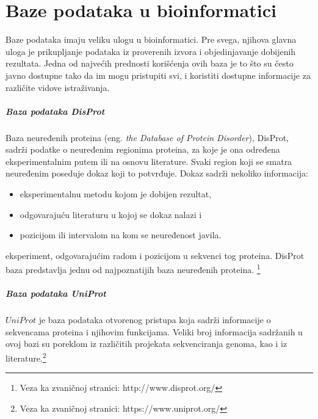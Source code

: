 
\section{Baze podataka u bioinformatici}

Baze podataka imaju veliku ulogu u bioinformatici. Pre svega, njihova glavna uloga je prikupljanje podataka iz proverenih izvora i objedinjavanje dobijenih rezultata. Jedna od najvećih prednosti korišćenja ovih baza je to što su često javno dostupne tako da im mogu pristupiti svi, i koristiti dostupne informacije za različite vidove istraživanja. 

\subparagraph{Baza podataka DisProt}

Baza neuređenih proteina (eng. \emph{the Database of Protein Disorder}), DisProt, sadrži podatke o neuređenim regionima proteina, za koje je ona  određena  eksperimentalnim putem ili na osnovu literature. Svaki region koji se smatra neuređenim poseduje dokaz koji to potvrđuje. Dokaz sadrži nekoliko informacija:
\begin{itemize}
\item eksperimentalnu metodu kojom je dobijen rezultat,
\item odgovarajuću literaturu u kojoj se dokaz nalazi i 
\item pozicijom ili intervalom na kom se neuređenost javila.
\end{itemize} eksperiment, odgovarajućim radom i pozicijom u sekvenci tog proteina. DisProt baza predstavlja jednu od najpoznatijih baza neuređenih proteina.  \footnote{Veza ka zvaničnoj stranici: http://www.disprot.org/}\
 \\

\subparagraph{Baza podataka UniProt}

$UniProt$ je baza podataka otvorenog pristupa koja sadrži informacije o sekvencama proteina i njihovim funkcijama. Veliki broj informacija sadržanih u ovoj bazi su poreklom iz različitih projekata sekvenciranja genoma, kao i iz literature.\footnote{Veza ka zvaničnoj stranici: https://www.uniprot.org/}

